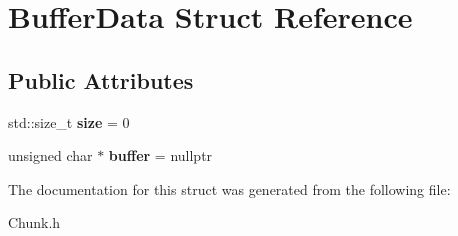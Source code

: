 \hypertarget{structBufferData}{}\section{Buffer\+Data Struct Reference}
\label{structBufferData}
\subsection*{Public Attributes}
\begin{DoxyCompactItemize}
\item 
\mbox{\label{structBufferData_a60bdf2a7642d448537617487e834243b}} 
std\+::size\+\_\+t {\bfseries size} = 0
\item 
\mbox{\label{structBufferData_a9da9557a263bca01e2c8b140ad29a8a5}} 
unsigned char $\ast$ {\bfseries buffer} = nullptr
\end{DoxyCompactItemize}


The documentation for this struct was generated from the following file\+:\begin{DoxyCompactItemize}
\item 
Chunk.\+h\end{DoxyCompactItemize}
